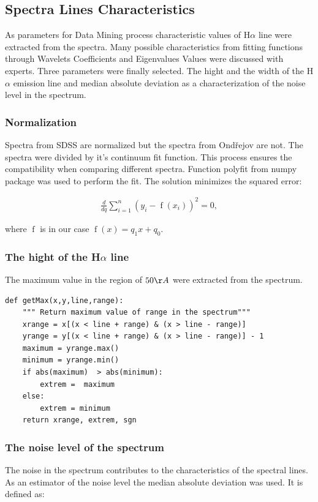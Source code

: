 \subsection{Spectra Lines Characteristics}
As parameters for Data Mining process characteristic values of
H$\alpha$ line were extracted from the spectra. Many possible
characteristics from fitting functions through Wavelets Coefficients
and Eigenvalues Values were discussed with experts. Three parameters
were finally selected. The hight and the width of the H$\alpha$
emission line and median absolute deviation as a characterization of
the noise level in the spectrum.


\subsubsection{Normalization}
Spectra from SDSS are normalized but the spectra from Ondřejov are
not. The spectra were divided by it's continuum fit function. This
process ensures the compatibility when comparing different
spectra. Function polyfit from numpy package was used to perform the
fit. The solution minimizes the squared error:

\begin{align}
  \frac{d}{dq} \sum_{i = 1}^n{(y_i - \operatorname{f}(x_i) )^2} = 0,
\end{align}

where $\operatorname{f}$ is in our case $\operatorname{f}(x) = q_1x +
q_0$.

\subsubsection{The hight of the H$\alpha$ line}
The maximum value in the region of $50\AA$ were extracted from the
spectrum.

\begin{lstlisting}
def getMax(x,y,line,range):
    """ Return maximum value of range in the spectrum"""
    xrange = x[(x < line + range) & (x > line - range)]
    yrange = y[(x < line + range) & (x > line - range)] - 1
    maximum = yrange.max()
    minimum = yrange.min()
    if abs(maximum)  > abs(minimum):
        extrem =  maximum 
    else:
        extrem = minimum 
    return xrange, extrem, sgn
\end{lstlisting}

\subsubsection{The noise level of the spectrum}
The noise in the spectrum contributes to the characteristics of the
spectral lines. As an estimator of the noise level the median
absolute deviation was used. It is defined as:

